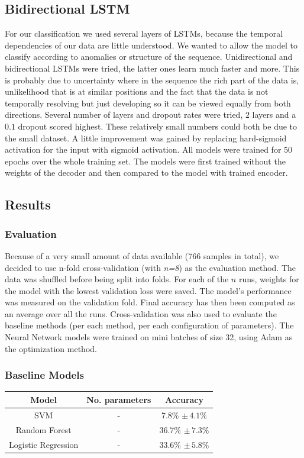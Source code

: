 \documentclass{article}
\begin{document}
\subsection{Bidirectional LSTM}
For our classification we used several layers of LSTMs, because the temporal dependencies of our data are little understood. We wanted to allow the model to classify according to anomalies or structure of the sequence. Unidirectional and bidirectional LSTMs were tried, the latter ones learn much faster and more. This is probably due to uncertainty where in the sequence the rich part of the data is, unlikelihood that is at similar positions and the fact that the data is not temporally resolving but just developing so it can be viewed equally from both directions. Several number of layers and dropout rates were tried, $2$ layers and a $0.1$ dropout scored highest. These relatively small numbers could both be due to the small dataset. A little improvement was gained by replacing hard-sigmoid activation for the input with sigmoid activation. All models were trained for $50$ epochs over the whole training set. The models were first trained without the weights of the decoder and then compared to the model with trained encoder.
\subsection{Results}
\subsubsection{Evaluation}
Because of a very small amount of data available (766 samples in total), we decided to use n-fold cross-validation (with \textit{n=8}) as the evaluation method. The data was shuffled before being split into folds. For each of the $n$ runs, weights for the model with the lowest validation loss were saved. The model's performance was measured on the validation fold. Final accuracy has then been computed as an average over all the runs.
Cross-validation was also used to evaluate the baseline methods (per each method, per each configuration of parameters).
\newline
The Neural Network models were trained on mini batches of size 32, using Adam \cite{Adam} as the optimization method.
\subsubsection{Baseline Models}
\begin{center}
\begin{tabular}{ c|c|c } 
 Model & No. parameters & Accuracy \\ 
 \hline
 SVM & - & 7.8\% $\pm \, 4.1\% $\\ 
 Random Forest & - & 36.7\% $\pm \, 7.3\%$ \\ 
 Logistic Regression & - & 33.6\% $\pm \, 5.8\%$ \\ 
\end{tabular}
\end{center}
\end{document}
